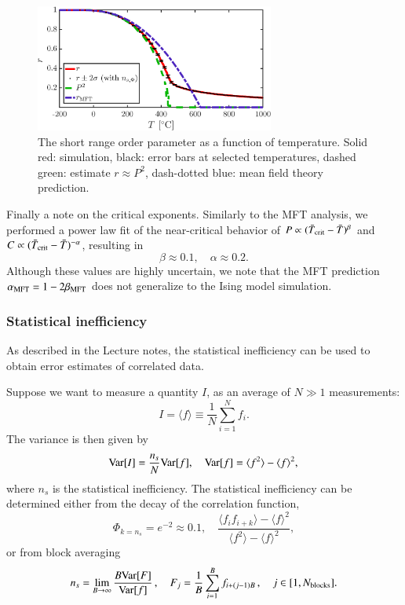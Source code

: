\begin{figure}[!ht]
\begin{center}
  \includegraphics[width=0.7\textwidth]{../figures/r} 
  \caption{The short range order parameter as a function of temperature. Solid red: simulation, black: error bars at selected temperatures, dashed green: estimate $r \approx P^2$, dash-dotted blue: mean field theory prediction. }
  \label{fig:r}
\end{center}
\end{figure}

Finally a note on the critical exponents. Similarly to the MFT
analysis, we performed a power law fit of the near-critical behavior
of $P\propto(\bar{T}_{\rm crit}-\bar{T})^{\beta}$ and
$C\propto(\bar{T}_{\rm crit}-\bar{T})^{-\alpha}$, resulting in  
\begin{equation}
\beta \approx 0.1, \quad \alpha \approx 0.2.
\end{equation}
Although these values are highly uncertain, we note that the MFT
prediction $\alpha_{\rm MFT} = 1-2\beta_{\rm MFT}$ does not generalize
to the Ising model simulation.  

\subsubsection*{Statistical inefficiency}
\label{sec:ns}
As described in the Lecture notes, the statistical inefficiency can be used to obtain error estimates of correlated data. 

Suppose we want to measure a quantity $I$, as an average of $N\gg1$ measurements: 
\begin{equation}
I = \langle f \rangle \equiv \frac{1}{N}\sum_{i = 1}^N f_i.
\end{equation}
The variance is then given by 
\begin{equation}
{\rm Var}[I] = \frac{n_s}{N}{\rm Var}[f], \quad {\rm Var}[f] = \langle f^2 \rangle - \langle f \rangle^2,
\end{equation}
where $n_s$ is the statistical inefficiency. 
The statistical inefficiency can be determined either from the decay of the correlation function, 
\begin{equation}
\Phi_{k = n_s} = e^{-2} \approx 0.1, \quad \frac{\langle f_i f_{i+k}\rangle - \langle f \rangle^2}{\langle f^2\rangle - \langle f \rangle^2},
\label{eq:ns_Phi}
\end{equation}
or from block averaging
\begin{equation}
n_s = \lim_{B \rightarrow \infty} \frac{B {\rm Var}[F]}{{\rm Var}[f]}\,, \quad F_j = \frac{1}{B}\sum_{i = 1}^B f_{i + (j-1)B}\,, \quad j \in [1, N_{\rm blocks} ].
\label{eq:ns_block}
\end{equation}

